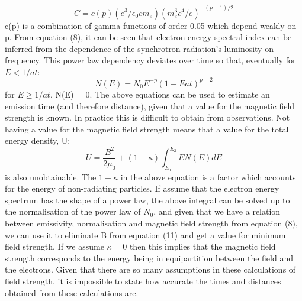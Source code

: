 \documentclass{article}
\begin{document}
\begin{equation}
    C = c(p)(e^3/\epsilon_0 c m_e)(m_e^3 c^4/e)^{-(p-1)/2}
\end{equation}
c(p) is a combination of gamma functions of order 0.05 which depend weakly on p. From equation (8), it can be seen that electron energy spectral index can be inferred from the dependence of the synchrotron radiation's luminosity on frequency. This power law dependency deviates over time so that, eventually for $ E < 1/at $:
\begin{equation}
    N(E) = N_0E^{-p} (1-Eat)^{p-2}
\end{equation}
for $E \geq 1/at$, N(E) = 0. The above equations can be used to estimate an emission time (and therefore distance), given that a value for the magnetic field strength is known. In practice this is difficult to obtain from observations. Not having a value for the magnetic field strength means that a value for the total energy density, U:
\begin{equation}
    U = \frac{B^2}{2\mu_0} + (1 + \kappa) \int_{E_1}^{E_2} EN(E)dE
\end{equation}
is also unobtainable. The $1 + \kappa$ in the above equation is a factor which accounts for the energy of non-radiating particles. If assume that the electron energy spectrum has the shape of a power law, the above integral can be solved up to the normalisation of the power law of $N_0$, and given that we have a relation between emissivity, normalisation and magnetic field strength from equation (8), we can use it to eliminate B from equation (11) and get a value for minimum field strength. If we assume $\kappa = 0$ then this implies that the magnetic field strength corresponds to the energy being in equipartition between the field and the electrons. Given that there are so many assumptions in these calculations of field strength, it is impossible to state how accurate the times and distances obtained from these calculations are.
\end{document}
